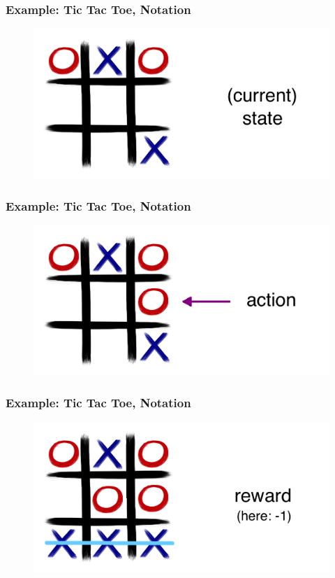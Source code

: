 \documentclass{beamer}
\begin{document}
\begin{frame}\frametitle{Example: Tic Tac Toe, Notation}\small
\vspace{4mm}

\begin{figure}
\includegraphics[width=0.75\linewidth]{Figures/tic1c}
\end{figure}
\vspace{5mm}
\end{frame}

\begin{frame}\frametitle{Example: Tic Tac Toe, Notation}\small
\vspace{4mm}

\begin{figure}
\includegraphics[width=0.75\linewidth]{Figures/tic1b}
\end{figure}
\vspace{5mm}
\end{frame}

\begin{frame}\frametitle{Example: Tic Tac Toe, Notation}\small
\vspace{4mm}

\begin{figure}
\includegraphics[width=0.75\linewidth]{Figures/tic1e}
\end{figure}
\vspace{5mm}
\end{frame}
\end{document}
